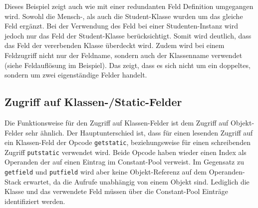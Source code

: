 \documentclass[conference]{IEEEtran}
\begin{document}
Dieses Beispiel zeigt auch wie mit einer redundanten Feld Definition umgegangen wird. Sowohl die Mensch-, als auch die Student-Klasse wurden um das gleiche Feld ergänzt. Bei der Verwendung des Feld bei einer Studenten-Instanz wird jedoch nur das Feld der Student-Klasse berücksichtigt. Somit wird deutlich, dass das Feld der vererbenden Klasse überdeckt wird. Zudem wird bei einem Feldzugriff nicht nur der Feldname, sondern auch der Klassenname verwendet (siehe Feldauflösung im Beispiel). Das zeigt, dass es sich nicht um ein doppeltes, sondern um zwei eigenständige Felder handelt. \cite{Venners.1996}


\subsection{Zugriff auf Klassen-/Static-Felder}
Die Funktionsweise für den Zugriff auf Klassen-Felder ist dem Zugriff auf Objekt-Felder sehr ähnlich. Der Hauptunterschied ist, dass für einen lesenden Zugriff auf ein Klassen-Feld der Opcode \verb|getstatic|, beziehungsweise für einen schreibenden Zugriff \verb|putstatic| verwendet wird. Beide Opcode haben wieder einen Index als Operanden der auf einen Eintrag im Constant-Pool verweist. Im Gegensatz zu \verb|getfield| und \verb|putfield| wird aber keine Objekt-Referenz auf dem Operanden-Stack erwartet, da die Aufrufe unabhängig von einem Objekt sind. Lediglich die Klasse und das verwendete Feld müssen über die Constant-Pool Einträge identifiziert werden.
\end{document}
